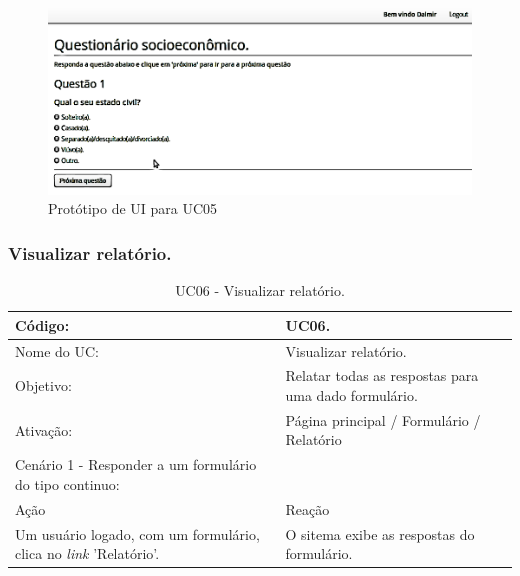 \documentclass[11pt]{article}
\begin{document}
        \begin{figure}[h!]
          \centering
          \includegraphics[width=.9\textwidth]{reply_a_form.png}
          \caption{Protótipo de UI para UC05}
        \end{figure}

    \clearpage
      
      \subsubsection{Visualizar relatório.}

        \begin{table}[h]
          \begin{center}
            \begin{tabular}{ | p{7cm} | p{8cm} | }
              \hline
              Código: \cellcolor{gray} & UC06. \\
              \hline
              Nome do UC: \cellcolor{gray} & Visualizar relatório. \\
              \hline
              Objetivo: \cellcolor{gray} & Relatar todas as respostas para uma dado formulário. \\
              \hline
              Ativação: \cellcolor{gray} & Página principal / Formulário / Relatório \\
              \hline
              \hline
              Cenário 1 - Responder a um formulário do tipo continuo: &  \\
              \hline
              Ação\cellcolor{gray} & Reação\cellcolor{gray} \\
              \hline
              Um usuário logado, com um formulário, clica no {\em link} 'Relatório'. & O sitema exibe as respostas do formulário. \\
              \hline
            \end{tabular}
            \caption{UC06 - Visualizar relatório.}
          \end{center}
        \end{table}
        
\end{document}
